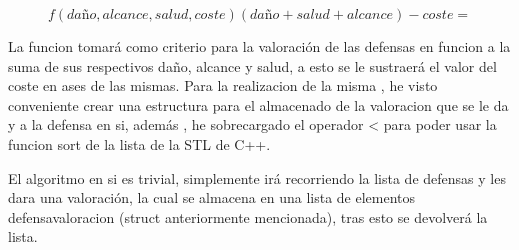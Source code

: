 $$ f(daño,alcance,salud,coste)(daño+salud+alcance)-coste=$$

La funcion tomará como criterio para la valoración de las defensas en funcion a la suma 
de sus respectivos daño, alcance y salud, a esto se le sustraerá el valor del coste en 
ases de las mismas.
Para la realizacion de la misma , he visto conveniente crear una estructura para el almacenado 
de la valoracion que se le da y a la defensa en si, además , he sobrecargado el operador < para 
poder usar la funcion sort de la lista de la STL de C++.

El algoritmo en si es trivial, simplemente irá recorriendo la lista de defensas y les dara una 
valoración, la cual se almacena en una lista de elementos defensavaloracion (struct anteriormente
mencionada), tras esto se devolverá la lista.
